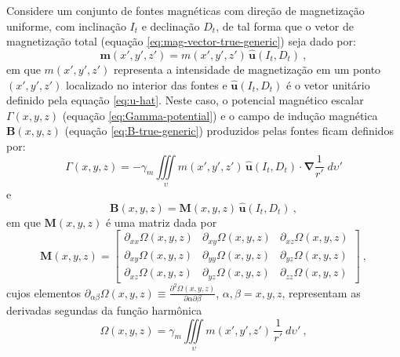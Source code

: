 Considere um conjunto de fontes magnéticas com direção de magnetização 
uniforme, com inclinação $I_{t}$ e declinação $D_{t}$, de tal forma que o vetor 
de magnetização total (equação \ref{eq:mag-vector-true-generic}) seja dado por:
\begin{equation}
\mathbf{m}(x', y', z') = m(x', y', z') \, \hat{\mathbf{u}}(I_{t}, D_{t}) \: ,
\label{eq:mag-vector-true-uniform}
\end{equation}
em que $m(x', y', z')$ representa a intensidade de magnetização em um ponto $(x', y', z')$ 
localizado no interior das fontes e $\hat{\mathbf{u}}(I_{t}, D_{t})$ é o vetor unitário 
definido pela equação \ref{eq:u-hat}.
Neste caso, o potencial magnético escalar $\Gamma(x, y, z)$ (equação \ref{eq:Gamma-potential}) 
e o campo de indução magnética $\mathbf{B}(x, y, z)$ (equação \ref{eq:B-true-generic}) produzidos 
pelas fontes ficam definidos por:
\begin{equation}
\Gamma(x, y, z) = - \gamma_{m} \iiint\limits_{\upsilon} 
m(x', y', z') \, \hat{\mathbf{u}}(I_{t}, D_{t}) \cdot \boldsymbol{\nabla} \frac{1}{r'} 
\; d\upsilon'
\label{eq:Gamma-potential-mag-uniform}
\end{equation}
e
\begin{equation}
\mathbf{B}(x, y, z) = \mathbf{M}(x, y, z) \, \hat{\mathbf{u}}(I_{t}, D_{t}) \: ,
\label{eq:B-true-mag-uniform}
\end{equation}
em que $\mathbf{M}(x, y, z)$ é uma matriz dada por
\begin{equation}
	\mathbf{M}(x, y, z) = \begin{bmatrix}
		\partial_{xx} \Omega(x, y, z) & 
		\partial_{xy} \Omega(x, y, z) &
		\partial_{xz} \Omega(x, y, z) \\
		\partial_{xy} \Omega(x, y, z) & 
		\partial_{yy} \Omega(x, y, z) &
		\partial_{yz} \Omega(x, y, z) \\
		\partial_{xz} \Omega(x, y, z) & 
		\partial_{yz} \Omega(x, y, z) &
		\partial_{zz} \Omega(x, y, z)
	\end{bmatrix} \: ,
	\label{eq:M-matrix}
\end{equation}
cujos elementos $\partial_{\alpha\beta} \Omega(x, y, z) \equiv 
\frac{\partial^{2} \Omega(x, y, z)}{\partial \alpha \partial \beta}$, 
$\alpha, \beta = x, y, z$, representam as derivadas segundas da função harmônica 
\begin{equation}
\Omega(x, y, z) = \gamma_{m} \iiint\limits_{\upsilon} 
m(x', y', z') \, \frac{1}{r'} \: d\upsilon' \: ,
\label{eq:Omega-potential}
\end{equation}
